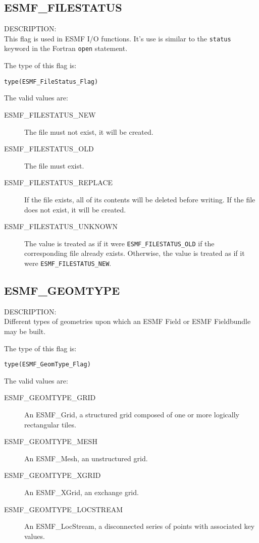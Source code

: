 \subsection{ESMF\_FILESTATUS}
\label{const:filestatusflag}
{\sf DESCRIPTION:\\}
This flag is used in ESMF I/O functions. It's use is similar to the
{\tt status} keyword in the Fortran {\tt open} statement.

The type of this flag is:

{\tt type(ESMF\_FileStatus\_Flag)}

The valid values are:
\begin{description}
\item [ESMF\_FILESTATUS\_NEW]
      The file must not exist, it will be created.
\item [ESMF\_FILESTATUS\_OLD]
      The file must exist.
\item [ESMF\_FILESTATUS\_REPLACE]
      If the file exists, all of its contents will be deleted before writing.
      If the file does not exist, it will be created.
\item [ESMF\_FILESTATUS\_UNKNOWN]
      The value is treated as if it were {\tt ESMF\_FILESTATUS\_OLD} if
      the corresponding file already exists. Otherwise, the value is
      treated as if it were {\tt ESMF\_FILESTATUS\_NEW}.

\end{description}

\subsection{ESMF\_GEOMTYPE}
\label{const:geomtype}

{\sf DESCRIPTION:\\}
 Different types of geometries upon which an ESMF Field or ESMF Fieldbundle may
be built. 

The type of this flag is:

{\tt type(ESMF\_GeomType\_Flag)}

The valid values are:
\begin{description}
\item [ESMF\_GEOMTYPE\_GRID]
      An ESMF\_Grid, a structured grid composed of one or more logically rectangular tiles.
\item [ESMF\_GEOMTYPE\_MESH]
      An ESMF\_Mesh, an unstructured grid.
\item [ESMF\_GEOMTYPE\_XGRID]
      An ESMF\_XGrid, an exchange grid.
\item [ESMF\_GEOMTYPE\_LOCSTREAM]
      An ESMF\_LocStream, a disconnected series of points with associated key values.
\end{description}

